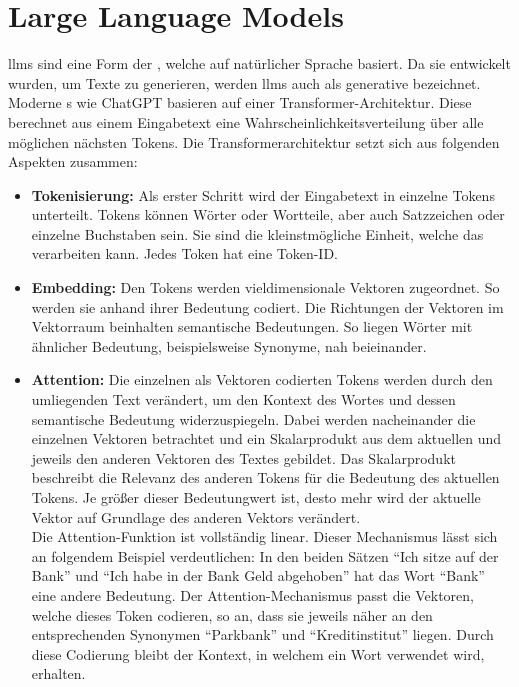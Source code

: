 \documentclass[../main.tex]{subfiles}
\begin{document}
\section{Large Language Models}

\glspl{llm} sind eine Form der , welche auf natürlicher Sprache basiert. Da sie entwickelt wurden, um Texte zu generieren, werden \glspl{llm} auch als generative  bezeichnet.
Moderne s wie ChatGPT basieren auf einer Transformer-Architektur. Diese berechnet aus einem Eingabetext eine Wahrscheinlichkeitsverteilung 
über alle möglichen nächsten Tokens. Die Transformerarchitektur setzt sich aus folgenden Aspekten zusammen:\cite{architecture}\\

\begin{itemize}

\item \textbf{Tokenisierung:} Als erster Schritt wird der Eingabetext in einzelne Tokens unterteilt. Tokens können Wörter oder Wortteile, aber auch Satzzeichen oder einzelne Buchstaben sein. Sie sind die kleinstmögliche Einheit, welche das  verarbeiten kann. Jedes Token hat eine Token-ID.\cite{architecture}

\item \textbf{Embedding:} Den Tokens werden vieldimensionale Vektoren zugeordnet. So werden sie anhand ihrer Bedeutung codiert. Die Richtungen der Vektoren im Vektorraum beinhalten semantische Bedeutungen. So liegen Wörter mit ähnlicher Bedeutung, beispielsweise Synonyme, nah beieinander.\cite{embedding}

\item \textbf{Attention:} Die einzelnen als Vektoren codierten Tokens werden durch den umliegenden Text verändert, um den Kontext des Wortes und dessen semantische Bedeutung widerzuspiegeln. Dabei werden nacheinander die einzelnen Vektoren betrachtet und ein Skalarprodukt aus dem aktuellen und jeweils den anderen Vektoren des Textes gebildet. Das Skalarprodukt beschreibt die Relevanz des anderen Tokens für die Bedeutung des aktuellen Tokens. Je größer dieser Bedeutungwert ist, desto mehr wird der aktuelle Vektor auf Grundlage des anderen Vektors verändert.\\
Die Attention-Funktion ist vollständig linear. Dieser Mechanismus lässt sich an folgendem Beispiel verdeutlichen: In den beiden Sätzen “Ich sitze auf der Bank” und “Ich habe in der Bank Geld abgehoben” hat das Wort “Bank” eine andere Bedeutung. Der Attention-Mechanismus passt die Vektoren, welche dieses Token codieren, so an, dass sie jeweils näher an den entsprechenden Synonymen “Parkbank” und “Kreditinstitut” liegen. Durch diese Codierung bleibt der Kontext, in welchem ein Wort verwendet wird, erhalten.\cite{attention, attention2} 


\end{itemize}
\end{document}

